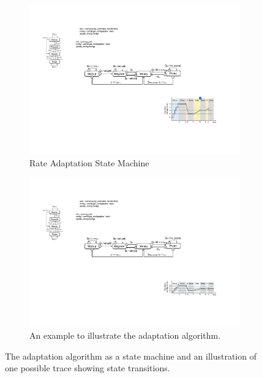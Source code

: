 \begin{figure}
  \begin{subfigure}[t]{\columnwidth}
    \centering
    \includegraphics[width=\columnwidth]{figures/cc.pdf}
    \caption{Rate Adaptation State Machine}
    \vspace{1em}
    \label{fig:cc-sm}
  \end{subfigure}
  \begin{subfigure}[t]{0.95\columnwidth}
    \centering
    \includegraphics[width=\columnwidth]{figures/cc2.pdf}
    \caption{An example to illustrate the adaptation algorithm.}
    \label{fig:cc-ex}
  \end{subfigure}

  \caption{The adaptation algorithm as a state machine and an illustration of
    one possible trace showing state transitions.}
  \label{fig:cc}
\end{figure}

